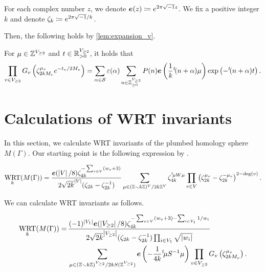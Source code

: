 \documentclass[11pt,a4paper,lualatex]{amsart}
\DeclareMathOperator{\WRT}{WRT}
\numberwithin{equation}{section} %
\begin{document}
For each complex number $ z $, we denote $ \bm{e}(z) \coloneqq e^{2\pi\iu z} $.
We fix a positive integer $ k $ and denote $ \zeta_k \coloneqq e^{2\pi\iu/k} $.

Then, the following holds by \cref{lem:expansion_v}. 

\begin{lem} \label{lem:expansion}
	For $ \mu \in \mathbb{Z}^{V_{\ge 2}} $ and $ t \in \mathbb{R}^{V_{\ge 2}}_{>0} $, it holds that
	\[
	\prod_{v \in V_{\ge 2}} G_{v} \left( \zeta_{2k M_v}^{\mu_v} e^{-t_v/2M_v} \right) 
	=
	\sum_{\alpha \in \mathcal{S}} \varepsilon(\alpha)
	\sum_{n \in \mathbb{Z}_{\ge 0}^{V_{\ge 3}}} P(n) \bm{e} \left( \frac{1}{k} {}^t\!(n + \alpha) \mu \right) \exp \left( -{}^t\!(n + \alpha) t \right) .
	\]
\end{lem}


\section{Calculations of WRT invariants} \label{sec:WRT}


In this section, we calculate WRT invariants of the plumbed homology sphere $ M(\Gamma) $.
Our starting point is the following expression by \cite{GPPV}. 

\begin{prop}
	\begin{align}
		\WRT_k(M(\Gamma))
		=
		\frac{\bm{e}(\abs{V}/8) \zeta_{4k}^{-\sum_{v \in V} (w_{v} + 3)}}
		{2 \sqrt{2k}^{\abs{V}} (\zeta_{2k} - \zeta_{2k}^{-1})}
		\sum_{\mu \in (\Z \smallsetminus k\Z)^V/2k\Z^V} \zeta_{4k}^{{}^t\!\mu W \mu}
		\prod_{v \in V} \left( \zeta_{2k}^{\mu_v} - \zeta_{2k}^{-\mu_v} \right)^{2-\deg(v)}.
	\end{align}
\end{prop}

We can calculate WRT invariants as follows.

\begin{prop} \label{prop:WRT_expression}
	\begin{align}
		\WRT_k(M(\Gamma))
		= \,
		&\frac{(-1)^{\abs{V_1}} \bm{e}(\abs{V_{\ge 2}}/8) \zeta_{4k}^{-\sum_{v \in V} (w_{v} + 3) - \sum_{i \in V_1} 1/w_i}}
		{2 \sqrt{2k}^{\abs{V_{\ge 2}}} (\zeta_{2k} - \zeta_{2k}^{-1}) \prod_{i \in V_1} \sqrt{\abs{w_i}}}
		\\
		&\sum_{\mu \in (\Z \smallsetminus k\Z)^{V_{\ge 2}}/2k S(\Z^{V_{\ge 2}})}
		\bm{e} \left( -\frac{1}{4k} {}^t\!\mu S^{-1} \mu \right)
		\prod_{v \in V_{\ge 2}} G_v \left( \zeta_{2kM_v}^{\mu_v} \right).
	\end{align}
\end{prop}
\end{document}
